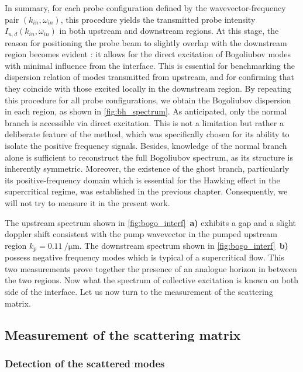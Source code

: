 In summary, for each probe configuration defined by the wavevector-frequency pair \((k_{in}, \omega_{in})\), this procedure yields the transmitted probe intensity \(I_{u,d}(k_{in}, \omega_{in})\) in both upstream and downstream regions.
At this stage, the reason for positioning the probe beam to slightly overlap with the downstream region becomes evident : it allows for the direct excitation of Bogoliubov modes with minimal influence from the interface. This is essential for benchmarking the dispersion relation of modes transmitted from upstream, and for confirming that they coincide with those excited locally in the downstream region.
By repeating this procedure for all probe configurations, we obtain the Bogoliubov dispersion in each region, as shown in \autoref{fig:bh_spectrum}.  As anticipated, only the normal branch is accessible via direct excitation. This is not a limitation but rather a deliberate feature of the method, which was specifically chosen for its ability to isolate the positive frequency signals. 
Besides, knowledge of the normal branch alone is sufficient to reconstruct the full Bogoliubov spectrum, as its structure is inherently symmetric. Moreover, the existence of the ghost branch, particularly its positive-frequency domain which is essential for the Hawking effect in the supercritical regime, was established in the previous chapter. Consequently, we will not try to measure it in the present work.

\bigskip 

The upstream spectrum shown in \autoref{fig:bogo_interf}~\textbf{a)} exhibits a gap and a slight doppler shift consistent with the pump wavevector in the pumped upstream region $k_p=\SI{0.11}{\per \micro \meter}$. The downstream spectrum shown in \autoref{fig:bogo_interf}~\textbf{b)} possess negative frequency modes which is typical of a supercritical flow.
This two measurements prove together the presence of an analogue horizon in between the two regions. Now what the spectrum of collective excitation is known on both side of the 
interface. Let us now turn to the measurement of the scattering matrix.

\subsection{Measurement of the scattering matrix}
\label{sec:scattering_matrix}

\subsubsection{Detection of the scattered modes}

